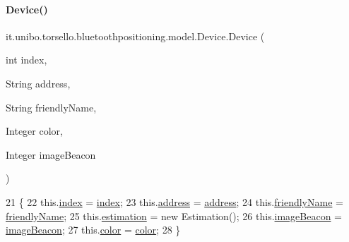 \paragraph{\texorpdfstring{Device()}{Device()}}
{\footnotesize\ttfamily it.\+unibo.\+torsello.\+bluetoothpositioning.\+model.\+Device.\+Device (\begin{DoxyParamCaption}\item[{int}]{index,  }\item[{String}]{address,  }\item[{String}]{friendly\+Name,  }\item[{Integer}]{color,  }\item[{Integer}]{image\+Beacon }\end{DoxyParamCaption})}


\begin{DoxyCode}
21                                                                                                       \{
22         this.\hyperlink{classit_1_1unibo_1_1torsello_1_1bluetoothpositioning_1_1model_1_1Device_a55a01164b2388451f5e8344bfbc61ccc_a55a01164b2388451f5e8344bfbc61ccc}{index} = \hyperlink{classit_1_1unibo_1_1torsello_1_1bluetoothpositioning_1_1model_1_1Device_a55a01164b2388451f5e8344bfbc61ccc_a55a01164b2388451f5e8344bfbc61ccc}{index};
23         this.\hyperlink{classit_1_1unibo_1_1torsello_1_1bluetoothpositioning_1_1model_1_1Device_a0abcf7e0df4ccc96e487c6f9b90b4e13_a0abcf7e0df4ccc96e487c6f9b90b4e13}{address} = \hyperlink{classit_1_1unibo_1_1torsello_1_1bluetoothpositioning_1_1model_1_1Device_a0abcf7e0df4ccc96e487c6f9b90b4e13_a0abcf7e0df4ccc96e487c6f9b90b4e13}{address};
24         this.\hyperlink{classit_1_1unibo_1_1torsello_1_1bluetoothpositioning_1_1model_1_1Device_aa9a540b316c9de7f9b3a94f58570f6d3_aa9a540b316c9de7f9b3a94f58570f6d3}{friendlyName} = \hyperlink{classit_1_1unibo_1_1torsello_1_1bluetoothpositioning_1_1model_1_1Device_aa9a540b316c9de7f9b3a94f58570f6d3_aa9a540b316c9de7f9b3a94f58570f6d3}{friendlyName};
25         this.\hyperlink{classit_1_1unibo_1_1torsello_1_1bluetoothpositioning_1_1model_1_1Device_ac619c42728cd40f41a5f12fde56b4425_ac619c42728cd40f41a5f12fde56b4425}{estimation} = \textcolor{keyword}{new} Estimation();
26         this.\hyperlink{classit_1_1unibo_1_1torsello_1_1bluetoothpositioning_1_1model_1_1Device_a54d308c064bbad3b1680895680697dd7_a54d308c064bbad3b1680895680697dd7}{imageBeacon} = \hyperlink{classit_1_1unibo_1_1torsello_1_1bluetoothpositioning_1_1model_1_1Device_a54d308c064bbad3b1680895680697dd7_a54d308c064bbad3b1680895680697dd7}{imageBeacon};
27         this.\hyperlink{classit_1_1unibo_1_1torsello_1_1bluetoothpositioning_1_1model_1_1Device_a903c767011327aa70b1e6c9ecf3b72eb_a903c767011327aa70b1e6c9ecf3b72eb}{color} = \hyperlink{classit_1_1unibo_1_1torsello_1_1bluetoothpositioning_1_1model_1_1Device_a903c767011327aa70b1e6c9ecf3b72eb_a903c767011327aa70b1e6c9ecf3b72eb}{color};
28     \}
\end{DoxyCode}


